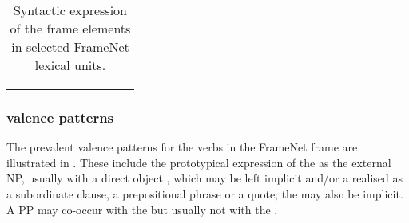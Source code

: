 \documentclass[output=paper,colorlinks,citecolor=brown]{langscibook}
\begin{document}
\begin{table}
\begin{tabular}{l rrrrrrrrr}
\lspbottomrule
 \end{tabular}
 \caption{Syntactic expression of the  frame elements in selected FrameNet lexical units. } 
    \label{tbl:telling-synt}
 \end{table}



\subsubsection{ valence patterns}

The prevalent valence patterns for the verbs in the FrameNet frame  are illustrated in . These include the prototypical expression of the  as the external NP, usually with a direct object , which may be left implicit and/or a  realised as a subordinate clause, a prepositional phrase or a quote; the  may also be implicit. A PP  may co-occur with the  but usually not with the .
\end{document}
